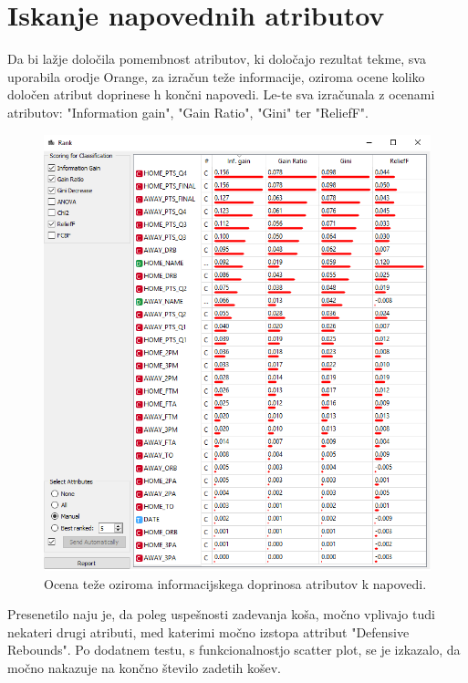 \documentclass[a4paper,11pt]{article}
\begin{document}
\section{Iskanje napovednih atributov}

Da bi lažje določila pomembnost atributov, ki določajo rezultat tekme, sva 
uporabila orodje Orange, za izračun teže informacije, oziroma ocene koliko 
določen atribut doprinese h končni napovedi. Le-te sva izračunala z ocenami atributov: 
 "Information gain", "Gain Ratio", "Gini" ter "ReliefF".

\begin{figure}[H]
\begin{center}
\includegraphics[scale=0.3]{OC_ranking_by_inf_gain.png}
\caption{Ocena teže oziroma informacijskega doprinosa atributov k napovedi.}
\label{slika2}
\end{center}
\end{figure} 

Presenetilo naju je, da poleg uspešnosti zadevanja koša, močno vplivajo tudi nekateri 
drugi atributi, med katerimi močno izstopa attribut "Defensive Rebounds". Po dodatnem testu, 
s funkcionalnostjo scatter plot, se je izkazalo, da močno nakazuje na končno število zadetih košev.
\end{document}
